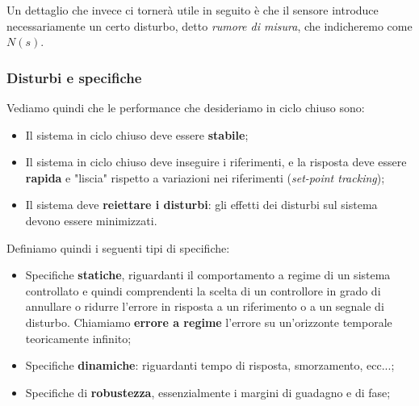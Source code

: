 \documentclass[a4paper,11pt]{article}
\begin{document}
Un dettaglio che invece ci tornerà utile in seguito è che il sensore introduce necessariamente un certo disturbo, detto \textit{rumore di misura}, che indicheremo come $N(s)$.

\subsubsection{Disturbi e specifiche}
Vediamo quindi che le performance che desideriamo in ciclo chiuso sono:
\begin{itemize}
	\item Il sistema in ciclo chiuso deve essere \textbf{stabile};
	\item Il sistema in ciclo chiuso deve inseguire i riferimenti, e la risposta deve essere \textbf{rapida} e "liscia" rispetto a variazioni nei riferimenti (\textit{set-point tracking});
	\item Il sistema deve \textbf{reiettare i disturbi}: gli effetti dei disturbi sul sistema devono essere minimizzati.
\end{itemize}

Definiamo quindi i seguenti tipi di specifiche:
\begin{itemize}
	\item Specifiche \textbf{statiche}, riguardanti il comportamento a regime di un sistema controllato e quindi comprendenti la scelta di un controllore in grado di annullare o ridurre l'errore in risposta a un riferimento o a un segnale di disturbo. Chiamiamo \textbf{errore a regime} l'errore su un'orizzonte temporale teoricamente infinito;
	\item Specifiche \textbf{dinamiche}: riguardanti tempo di risposta, smorzamento, ecc...;
	\item Specifiche di \textbf{robustezza}, essenzialmente i margini di guadagno e di fase;
\end{itemize}
\end{document}
